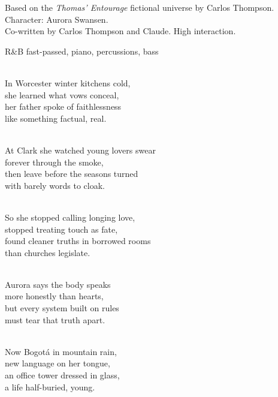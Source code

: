 

\begin{notes}
Based on the \emph{Thomas’ Entourage} fictional universe by Carlos Thompson.\\
Character: Aurora Swansen.\\
Co-written by Carlos Thompson and Claude. %
High interaction.
\end{notes}

\begin{style}
R\&B fast-passed, piano, percussions, bass
\end{style}

\begin{lyrics}

\\
In Worcester winter kitchens cold,\\
she learned what vows conceal,\\
her father spoke of faithlessness\\
like something factual, real.

\\
At Clark she watched young lovers swear\\
forever through the smoke,\\
then leave before the seasons turned\\
with barely words to cloak.

\\
So she stopped calling longing love,\\
stopped treating touch as fate,\\
found cleaner truths in borrowed rooms\\
than churches legislate.

\\
Aurora says the body speaks\\
more honestly than hearts,\\
but every system built on rules\\
must tear that truth apart.

\\
Now Bogotá in mountain rain,\\
new language on her tongue,\\
an office tower dressed in glass,\\
a life half-buried, young.


\end{lyrics}
